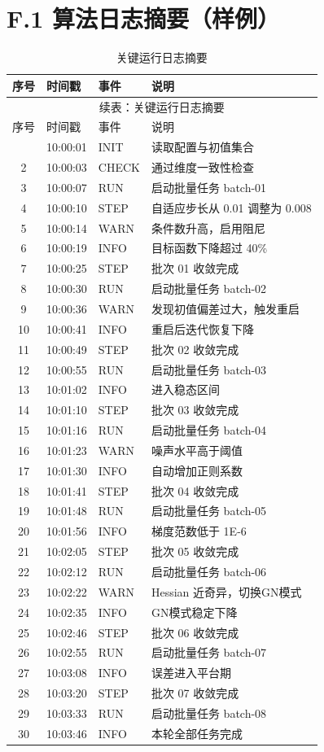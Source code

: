 \section*{F.1 算法日志摘要（样例）}
{
\footnotesize
\begin{longtable}{clll}
\caption{关键运行日志摘要}\\
\toprule
序号 & 时间戳 & 事件 & 说明\\
\midrule
\endfirsthead
\multicolumn{4}{c}{续表：关键运行日志摘要}\\
\toprule
序号 & 时间戳 & 事件 & 说明\\
\midrule
\endhead
\bottomrule
\endfoot
1 & 10:00:01 & INIT & 读取配置与初值集合\\
2 & 10:00:03 & CHECK & 通过维度一致性检查\\
3 & 10:00:07 & RUN & 启动批量任务 batch-01\\
4 & 10:00:10 & STEP & 自适应步长从 0.01 调整为 0.008\\
5 & 10:00:14 & WARN & 条件数升高，启用阻尼\\
6 & 10:00:19 & INFO & 目标函数下降超过 40\%\\
7 & 10:00:25 & STEP & 批次 01 收敛完成\\
8 & 10:00:30 & RUN & 启动批量任务 batch-02\\
9 & 10:00:36 & WARN & 发现初值偏差过大，触发重启\\
10 & 10:00:41 & INFO & 重启后迭代恢复下降\\
11 & 10:00:49 & STEP & 批次 02 收敛完成\\
12 & 10:00:55 & RUN & 启动批量任务 batch-03\\
13 & 10:01:02 & INFO & 进入稳态区间\\
14 & 10:01:10 & STEP & 批次 03 收敛完成\\
15 & 10:01:16 & RUN & 启动批量任务 batch-04\\
16 & 10:01:23 & WARN & 噪声水平高于阈值\\
17 & 10:01:30 & INFO & 自动增加正则系数\\
18 & 10:01:41 & STEP & 批次 04 收敛完成\\
19 & 10:01:48 & RUN & 启动批量任务 batch-05\\
20 & 10:01:56 & INFO & 梯度范数低于 1E-6\\
21 & 10:02:05 & STEP & 批次 05 收敛完成\\
22 & 10:02:12 & RUN & 启动批量任务 batch-06\\
23 & 10:02:22 & WARN & Hessian 近奇异，切换GN模式\\
24 & 10:02:35 & INFO & GN模式稳定下降\\
25 & 10:02:46 & STEP & 批次 06 收敛完成\\
26 & 10:02:55 & RUN & 启动批量任务 batch-07\\
27 & 10:03:08 & INFO & 误差进入平台期\\
28 & 10:03:20 & STEP & 批次 07 收敛完成\\
29 & 10:03:33 & RUN & 启动批量任务 batch-08\\
30 & 10:03:46 & INFO & 本轮全部任务完成\\
\end{longtable}
}
